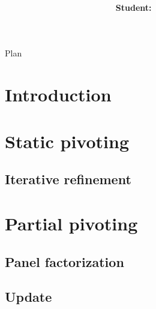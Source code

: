 \documentclass{beamer}
\title[LU decomposition on DaGUE]{
        {\bfseries \projet\\} 
        {\bfseries \huge \sujet}
}
\author[Zenati]{
  {\normalsize \bfseries \sffamily Student:} {\large \gA}~~~~~~~~~~\\
}
\begin{document}
        
\begin{frame}
\maketitle
\end{frame}

\begin{frame}{Plan}
\tableofcontents
\end{frame}


\section{Introduction}

\section{Static pivoting}
\subsection{Iterative refinement}
\section{Partial pivoting}
\subsection{Panel factorization}
\subsection{Update}
\end{document}
